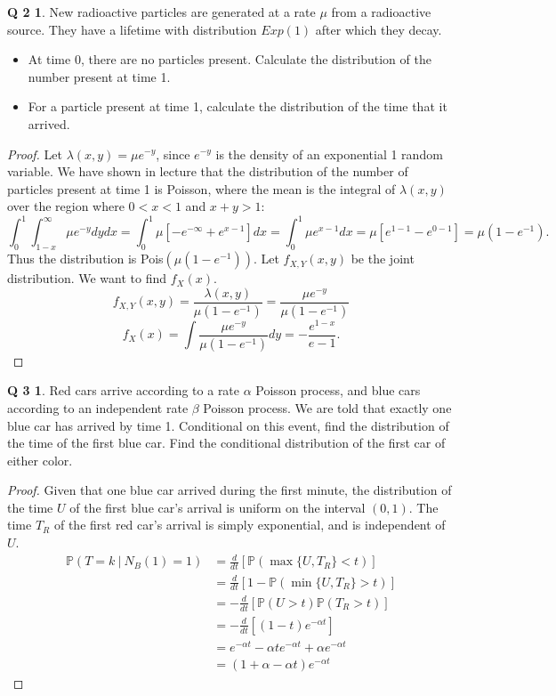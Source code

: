 \documentclass[12pt]{article}
\newcommand{\p}{\mathbb{P}}
\theoremstyle{definition}
\newtheorem*{prob2}{Q 2}
\newtheorem*{prob3}{Q 3}
\begin{document}
\begin{prob2}
New radioactive particles are generated at a rate $\mu$ from a radioactive source.  They have a lifetime with distribution $Exp(1)$ after which they decay.
\begin{itemize}
\item At time 0, there are no particles present.  Calculate the distribution of the number present at time 1.
\item For a particle present at time 1, calculate the distribution of the time that it arrived.
\end{itemize}
\end{prob2}

\begin{proof}
Let $\lambda(x,y) = \mu e^{-y}$, since $e^{-y}$ is the density of an exponential 1 random variable.  We have shown in lecture that the distribution of the number of particles present at time 1 is Poisson, where the mean is the integral of $\lambda(x,y)$ over the region where $0 < x < 1$ and $x+y > 1$:
$$
\int_0^1 \int_{1-x}^\infty \mu e^{-y} dy dx
= \int_0^1 \mu [-e^{-\infty} + e^{x-1}]dx
= \int_0^1 \mu e^{x-1}dx
= \mu[e^{1-1} - e^{0-1}] = \mu(1-e^{-1}).
$$
Thus the distribution is Pois$(\mu(1-e^{-1}))$.  Let $f_{X,Y}(x,y)$ be the joint distribution.  We want to find $f_X(x)$.
$$f_{X,Y}(x,y) = \frac{\lambda(x,y)}{\mu(1-e^{-1})}
= \frac{\mu e^{-y}}{\mu(1-e^{-1})}$$
$$f_{X}(x) = \int \frac{\mu e^{-y}}{\mu(1-e^{-1})}dy = -\frac{e^{1-x}}{e-1}.$$
\end{proof}


\begin{prob3}
Red cars arrive according to a rate $\alpha$ Poisson process, and blue cars according to an independent rate $\beta$ Poisson process.  We are told that exactly one blue car has arrived by time 1.  Conditional on this event, find the distribution of the time of the first blue car.  Find the conditional distribution of the first car of either color.
\end{prob3}

\begin{proof}
Given that one blue car arrived during the first minute, the distribution of the time $U$ of the first blue car's arrival is uniform on the interval $(0,1)$.  The time $T_R$ of the first red car's arrival is simply exponential, and is independent of $U$.
\begin{align*}
\p(T = k \ | \ N_B(1) = 1) &= \frac{d}{dt}\left[ \p(\max\{U,T_R\} < t) \right]
\\
&= \frac{d}{dt}\left[ 1 - \p(\min\{U,T_R\} > t) \right]
\\
&= -\frac{d}{dt}\left[\p(U > t)\p(T_R > t)
\right]
\\
&= -\frac{d}{dt}\left[(1-t)e^{-\alpha t}
\right]
\\
&= e^{-\alpha t} - \alpha t e^{-\alpha t} + \alpha e^{-\alpha t}
\\
&= (1 + \alpha - \alpha t) e^{-\alpha t}
\end{align*}
\end{proof}
\end{document}
